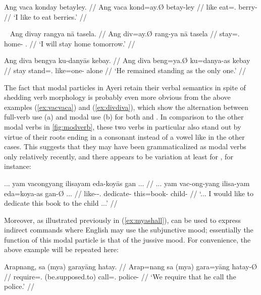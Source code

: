 \a\label{ex:vacamod}\begingl
	\gla Ang vaca konday betayley. //
	\glb Ang vaca kond=ay.Ø betay-ley //
	\glc \AgtT{} like eat=\Fsg{}.\Top{} berry-\PargI{} //
	\glft `I like to eat berries.' //
\endgl
\xe

\pex~\label{ex:divdiva}
\a\label{ex:divfull}\begingl
	\gla Ang divay rangya nā tasela. //
	\glb Ang div=ay.Ø rang-ya nā tasela //
	\glc \AgtT{} stay=\Fsg{}.\Top{} home-\Loc{} \Fsg{}.\Gen{} //
	\glft `I will stay home tomorrow.' //
\endgl

\a\label{ex:divamod}\begingl
	\gla Ang diva bengya ku-danyās kebay. //
	\glb Ang diva beng=ya.Ø ku=danya-as kebay //
	\glc \AgtT{} stay stand=\TsgM{}.\Top{} like=one-\Parg{} alone //
	\glft `He remained standing as the only one.' //
\endgl
\xe

The fact that modal particles in Ayeri retain their verbal semantics in spite 
of shedding verb morphology is probably even more obvious from the above 
examples (\ref{ex:vacvaca}) and (\ref{ex:divdiva}), which show the alternation 
between full-verb use (a) and modal use (b) for both  and 
. In comparison to the other modal verbs in 
\autoref{fig:modverb}, these two verbs in particular also stand out by virtue 
of their roots ending in a consonant instead of a vowel like in the other 
cases. This suggests that they may have been grammaticalized as modal verbs 
only relatively recently, and there appears to be variation at least for 
, for instance:

\ex\begingl
	\gla ... yam vacongyang ilisayam eda-koyās gan ... //
	\glb ... yam vac-ong-yang ilisa-yam eda=koya-as gan-Ø ... //
	\glc {} \DatT{} like-\Irr{}-\Fsg{}.\Aarg{} dedicate-\Ptcp{} 		
		this=book-\Parg{} child-\Top{} {} //
	\glft `... I would like to dedicate this book to the child ...' 
		 //
\endgl\xe

Moreover, as illustrated previously in (\ref{ex:myashall}),  can be used to express indirect commands where English may 
use the subjunctive mood; essentially the function of this modal particle is 
that of the jussive mood. For convenience, the above example will be repeated 
here:

\ex\begingl
	\gla Arapnang, sa (mya) garayāng hatay. //
	\glb Arap=nang sa (mya) gara=yāng hatay-Ø //
	\glc require=\Fpl{}.\Aarg{} \PatT{} (be.supposed.to) 
		call=\TsgM{}.\Aarg{} police-\Top{} //
	\glft `We require that he call the police.' //
\endgl\xe

